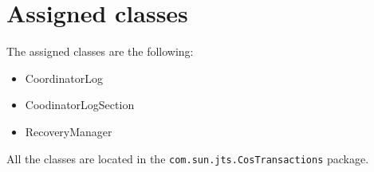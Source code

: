\section{Assigned classes}
\label{sec:classes}

The assigned classes are the following:
\begin{itemize}
    \item CoordinatorLog
    \item CoodinatorLogSection
    \item RecoveryManager
\end{itemize}

All the classes are located in the \texttt{com.sun.jts.CosTransactions} package.
